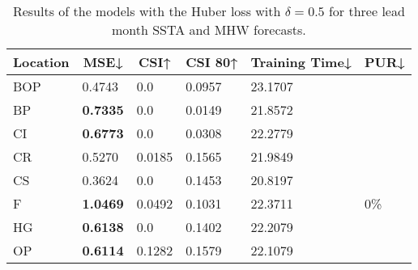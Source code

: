 \documentclass[11pt, a4paper]{article}
\begin{document}
\begin{table}[H]
\centering
\small
\caption{Results of the models with the Huber loss with $\delta=0.5$ for three lead month SSTA and MHW forecasts.}
\begin{tabular}{llllll}
\multicolumn{1}{c}{\textbf{Location}} & \multicolumn{1}{c}{\textbf{MSE↓}} & \multicolumn{1}{c}{\textbf{CSI↑}} & \multicolumn{1}{c}{\textbf{CSI 80↑}} & \multicolumn{1}{c}{\textbf{Training Time↓}} & \multicolumn{1}{c}{\textbf{PUR↓}} \\ \hline
BOP                         & 0.4743                            & 0.0                               & 0.0957                               & 23.1707                                     &                                   \\
BP                        & \textbf{0.7335}                   & 0.0                               & 0.0149                               & 21.8572                                     &                                   \\
CI                        & \textbf{0.6773}                   & 0.0                               & 0.0308                               & 22.2779                                     &                                   \\
CR                           & 0.5270                            & 0.0185                            & 0.1565                               & 21.9849                                     &                                   \\
CS                           & 0.3624                            & 0.0                               & 0.1453                               & 20.8197                                     &                                   \\
F                             & \textbf{1.0469}                   & 0.0492                            & 0.1031                               & 22.3711                                     & 0\%                               \\
HG                          & \textbf{0.6138}                   & 0.0                               & 0.1402                               & 22.2079                                     &                                   \\
OP                       & \textbf{0.6114}                   & 0.1282                            & 0.1579                               & 22.1079                                     &                                   \\

\end{tabular}
\end{table}
\end{document}
